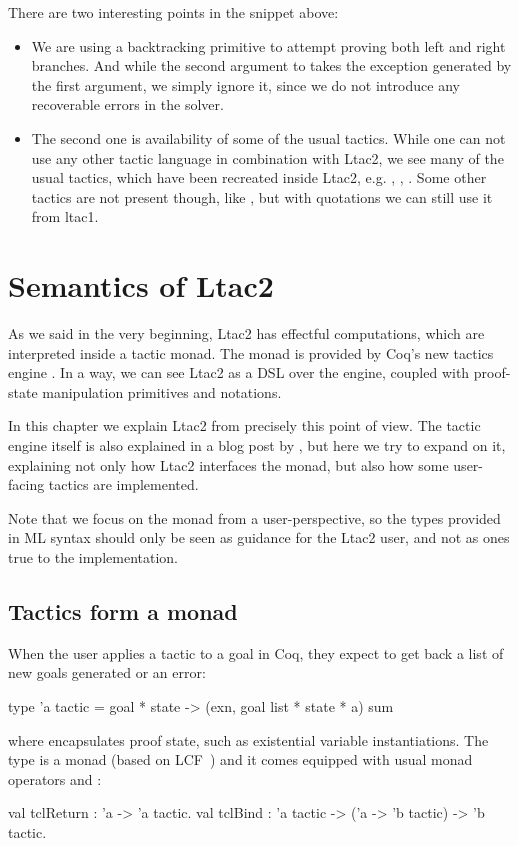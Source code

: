 There are two interesting points in the snippet above:
\begin{itemize}
\item We are using a backtracking primitive  to attempt proving both left and right branches.
  And while the second argument to  takes the exception generated by the first argument, we simply ignore it, since we do not introduce any recoverable errors in the solver.
\item The second one is availability of some of the usual tactics.
  While one can not use any other tactic language in combination with Ltac2, we see many of the usual tactics, which have been recreated inside Ltac2, e.g.  , , .
  Some other tactics are not present though, like , but with quotations we can still use it from ltac1.
\end{itemize}

\section{Semantics of Ltac2}
\label{sec:semantics-ltac2}

As we said in the very beginning, Ltac2 has effectful computations, which are interpreted inside a tactic monad.
The monad is provided by Coq's new tactics engine \cite{spiwackAbstractTypeConstructing2010}.
In a way, we can see Ltac2 as a DSL over the engine, coupled with proof-state manipulation primitives and notations.

In this chapter we explain Ltac2 from precisely this point of view.
The tactic engine itself is also explained in a blog post by \citet{pedrotCoqHoTTminuteTickingClockwork2016}, but here we try to expand on it, explaining not only how Ltac2 interfaces the monad, but also how some user-facing tactics are implemented.

Note that we focus on the monad from a user-perspective, so the types provided in ML syntax should only be seen as guidance for the Ltac2 user, and not as ones true to the implementation.

\subsection{Tactics form a monad}
\label{sec:monad-tactics}

When the user applies a tactic to a goal in Coq, they expect to get back a list of new goals generated or an error:
\begin{ocaml}
type 'a tactic = goal * state -> (exn, goal list * state * a) sum
\end{ocaml}
where  encapsulates proof state, such as existential variable instantiations.
The  type is a monad (based on LCF~\cite{gordonEdinburghLCFMechanised1979}) and it comes equipped with usual monad operators  and :
\begin{ocaml}
val tclReturn : 'a -> 'a tactic.
val tclBind : 'a tactic -> ('a -> 'b tactic) -> 'b tactic.
\end{ocaml}

